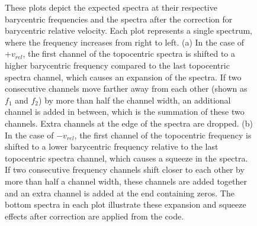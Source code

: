 \begin{figure}[h]
    \caption{These plots depict the expected spectra at their respective barycentric frequencies and the spectra after the correction for barycentric relative velocity. Each plot represents a single spectrum, where the frequency increases from right to left. (a) In the case of $+v_{rel}$, the first channel of the topocentric spectra is shifted to a higher barycentric frequency compared to the last topocentric spectra channel, which causes an expansion of the spectra. If two consecutive channels move farther away from each other (shown as $f_1$ and $f_2$) by more than half the channel width, an additional channel is added in between, which is the summation of these two channels. Extra channels at the edge of the spectra are dropped. (b) In the case of $-v_{rel}$, the first channel of the topocentric frequency is shifted to a lower barycentric frequency relative to the last topocentric spectra channel, which causes a squeeze in the spectra. If two consecutive frequency channels shift closer to each other by more than half a channel width, these channels are added together and an extra channel is added at the end containing zeros. The bottom spectra in each plot illustrate these expansion and squeeze effects after correction are applied from the code. 
    }
    \label{fig:spectra_expands_squeeze}
\end{figure}

